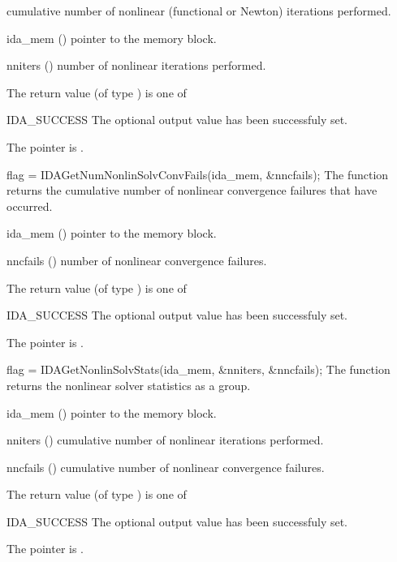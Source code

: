 {{  cumulative number of nonlinear (functional or Newton) iterations performed. 
}
{
  \begin{args}[nniters]
  \item[ida\_mem] ()
    pointer to the {\ida} memory block.
  \item[nniters] ()
    number of nonlinear iterations performed.
  \end{args}
}
{
  The return value  (of type ) is one of
  \begin{args}
  \item[IDA\_SUCCESS] 
    The optional output value has been successfuly set.
  \item[\Id{IDA\_MEM\_NULL}]
    The  pointer is .
  \end{args}
}
{}
{
  flag = IDAGetNumNonlinSolvConvFails(ida\_mem, \&nncfails);
}
{
  The function  returns the
  cumulative number of nonlinear convergence failures that have occurred.
}
{
  \begin{args}[nncfails]
  \item[ida\_mem] ()
    pointer to the {\ida} memory block.
  \item[nncfails] ()
    number of nonlinear convergence failures.
  \end{args}
}
{
  The return value  (of type ) is one of
  \begin{args}
  \item[IDA\_SUCCESS] 
    The optional output value has been successfuly set.
  \item[\Id{IDA\_MEM\_NULL}]
    The  pointer is .
  \end{args}
}
{}
{
  flag = IDAGetNonlinSolvStats(ida\_mem, \&nniters, \&nncfails);
}
{
  The function  returns the
  {\ida} nonlinear solver statistics as a group.
}
{
  \begin{args}[nncfails]
  \item[ida\_mem] ()
    pointer to the {\ida} memory block.
  \item[nniters] ()
    cumulative number of nonlinear iterations performed.
  \item[nncfails] ()
    cumulative number of nonlinear convergence failures.
  \end{args}
}
{
  The return value  (of type ) is one of
  \begin{args}
  \item[IDA\_SUCCESS] 
    The optional output value has been successfuly set.
  \item[\Id{IDA\_MEM\_NULL}]
    The  pointer is .
  \end{args}
}
{}
}
